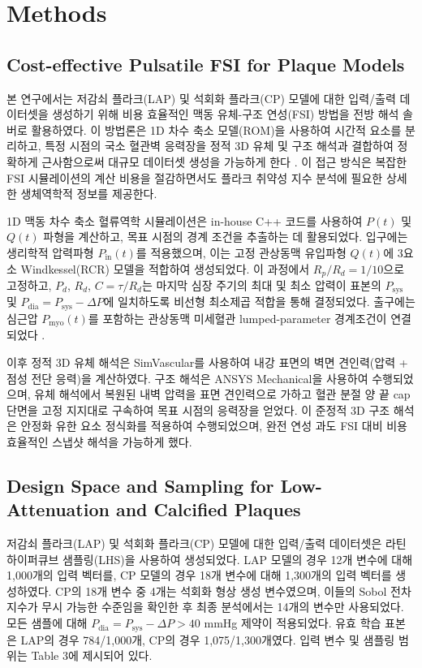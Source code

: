 \documentclass[preprint,12pt]{elsarticle}
\begin{document}
\section{Methods}

\subsection{Cost-effective Pulsatile FSI for Plaque Models}
본 연구에서는 저감쇠 플라크(LAP) 및 석회화 플라크(CP) 모델에 대한 입력/출력 데이터셋을 생성하기 위해 비용 효율적인 맥동 유체-구조 연성(FSI) 방법을 전방 해석 솔버로 활용하였다. 이 방법론은 1D 차수 축소 모델(ROM)을 사용하여 시간적 요소를 분리하고, 특정 시점의 국소 혈관벽 응력장을 정적 3D 유체 및 구조 해석과 결합하여 정확하게 근사함으로써 대규모 데이터셋 생성을 가능하게 한다 \cite{kim2010}. 이 접근 방식은 복잡한 FSI 시뮬레이션의 계산 비용을 절감하면서도 플라크 취약성 지수 분석에 필요한 상세한 생체역학적 정보를 제공한다.

1D 맥동 차수 축소 혈류역학 시뮬레이션은 in-house C++ 코드를 사용하여 $P(t)$ 및 $Q(t)$ 파형을 계산하고, 목표 시점의 경계 조건을 추출하는 데 활용되었다. 입구에는 생리학적 압력파형 $P_\text{in}(t)$를 적용했으며, 이는 고정 관상동맥 유입파형 $Q(t)$에 3요소 Windkessel(RCR) 모델을 적합하여 생성되었다. 이 과정에서 $R_p/R_d=1/10$으로 고정하고, $P_d$, $R_d$, $C=\tau/R_d$는 마지막 심장 주기의 최대 및 최소 압력이 표본의 $P_\text{sys}$ 및 $P_\text{dia}=P_\text{sys}-\Delta P$에 일치하도록 비선형 최소제곱 적합을 통해 결정되었다. 출구에는 심근압 $P_\text{myo}(t)$를 포함하는 관상동맥 미세혈관 lumped-parameter 경계조건이 연결되었다 \cite{kim2010}.

이후 정적 3D 유체 해석은 SimVascular를 사용하여 내강 표면의 벽면 견인력(압력 + 점성 전단 응력)을 계산하였다. 구조 해석은 ANSYS Mechanical을 사용하여 수행되었으며, 유체 해석에서 복원된 내벽 압력을 표면 견인력으로 가하고 혈관 분절 양 끝 cap 단면을 고정 지지대로 구속하여 목표 시점의 응력장을 얻었다. 이 준정적 3D 구조 해석은 안정화 유한 요소 정식화를 적용하여 수행되었으며, 완전 연성 과도 FSI 대비 비용 효율적인 스냅샷 해석을 가능하게 했다.

\subsection{Design Space and Sampling for Low-Attenuation and Calcified Plaques}
저감쇠 플라크(LAP) 및 석회화 플라크(CP) 모델에 대한 입력/출력 데이터셋은 라틴 하이퍼큐브 샘플링(LHS)을 사용하여 생성되었다. LAP 모델의 경우 12개 변수에 대해 1,000개의 입력 벡터를, CP 모델의 경우 18개 변수에 대해 1,300개의 입력 벡터를 생성하였다. CP의 18개 변수 중 4개는 석회화 형상 생성 변수였으며, 이들의 Sobol 전차 지수가 무시 가능한 수준임을 확인한 후 최종 분석에서는 14개의 변수만 사용되었다. 모든 샘플에 대해 $P_\text{dia}=P_\text{sys}-\Delta P > 40$ mmHg 제약이 적용되었다. 유효 학습 표본은 LAP의 경우 784/1,000개, CP의 경우 1,075/1,300개였다. 입력 변수 및 샘플링 범위는 Table 3에 제시되어 있다.
\end{document}
